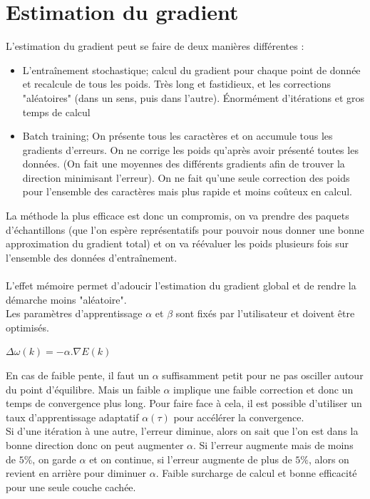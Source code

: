 \documentclass[a4paper,12pt,oneside]{report}	%
\begin{document}
    \section{Estimation du gradient}
        L'estimation du gradient peut se faire de deux manières différentes :
        \begin{itemize}
            \item L'entraînement stochastique; calcul du gradient pour chaque point de donnée et recalcule de tous les poids. Très long et fastidieux, et les corrections "aléatoires" (dans un sens, puis dans l'autre). \colorbox{bright-red}{Énormément d'itérations et gros temps de calcul}
            \item Batch training; On présente tous les caractères et on accumule tous les gradients d'erreurs. On ne corrige les poids qu'après avoir présenté toutes les données. (On fait une moyennes des différents gradients afin de trouver la direction minimisant l'erreur). \colorbox{bright-red}{On ne fait qu'une seule correction des poids pour l’ensemble des caractères} mais \colorbox{bright-green}{plus rapide et moins coûteux en calcul.}
        \end{itemize}
        La méthode la plus efficace est donc un compromis, on va prendre des paquets d'échantillons (que l'on espère représentatifs pour pouvoir nous donner une bonne approximation du gradient total) et on va réévaluer les poids plusieurs fois sur l'ensemble des données d'entraînement.\\\\
        L'effet mémoire permet d'adoucir l'estimation du gradient global et de rendre la démarche moins "aléatoire". \\
        Les paramètres d'apprentissage $\alpha$ et $\beta$ sont fixés par l'utilisateur et doivent être optimisés. 
        \begin{center}
            $\Delta \omega(k) = -\alpha. \nabla E(k)$            
        \end{center}
        En cas de faible pente, il faut un $\alpha$ suffisamment petit pour ne pas osciller autour du point d'équilibre. Mais un faible $\alpha$ implique une faible correction et donc un temps de convergence plus long. Pour faire face à cela, il est possible d'utiliser un taux d'apprentissage adaptatif $\alpha(\tau)$ pour accélérer la convergence.\\
        Si d'une itération à une autre, l'erreur diminue, alors on sait que l'on est dans la bonne direction donc on peut augmenter $\alpha$. Si l'erreur augmente mais de moins de $5\%$, on garde $\alpha$ et on continue, si l'erreur augmente de plus de $5\%$, alors on revient en arrière pour diminuer $\alpha$. \colorbox{bright-green}{Faible surcharge de calcul et bonne efficacité pour une seule couche cachée.}\\
\end{document}
